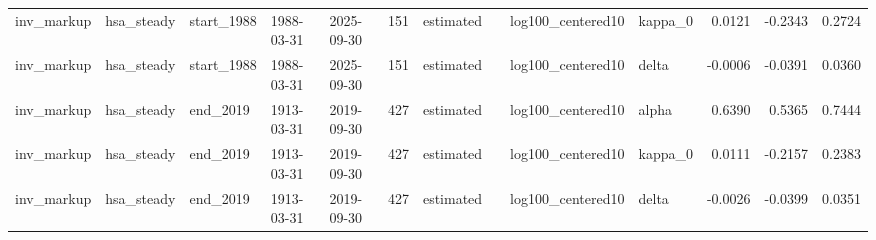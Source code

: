 \begin{tabular}{lllllrllllrrr}
inv\_markup & hsa\_steady & start\_1988 & 1988-03-31 & 2025-09-30 & 151 & estimated &  & log100\_centered10 & kappa\_0 & 0.0121 & -0.2343 & 0.2724 \\
inv\_markup & hsa\_steady & start\_1988 & 1988-03-31 & 2025-09-30 & 151 & estimated &  & log100\_centered10 & delta & -0.0006 & -0.0391 & 0.0360 \\
inv\_markup & hsa\_steady & end\_2019 & 1913-03-31 & 2019-09-30 & 427 & estimated &  & log100\_centered10 & alpha & 0.6390 & 0.5365 & 0.7444 \\
inv\_markup & hsa\_steady & end\_2019 & 1913-03-31 & 2019-09-30 & 427 & estimated &  & log100\_centered10 & kappa\_0 & 0.0111 & -0.2157 & 0.2383 \\
inv\_markup & hsa\_steady & end\_2019 & 1913-03-31 & 2019-09-30 & 427 & estimated &  & log100\_centered10 & delta & -0.0026 & -0.0399 & 0.0351 \\
\bottomrule
\end{tabular}
